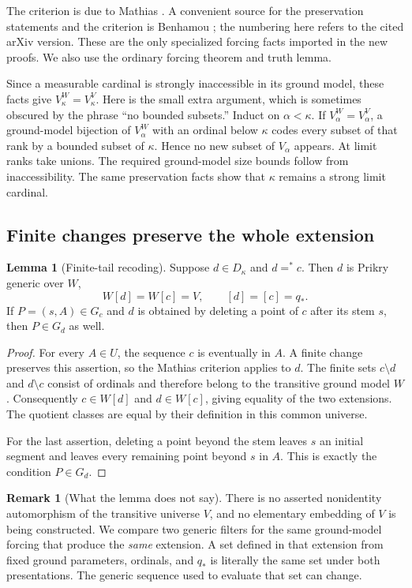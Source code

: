 \documentclass[11pt,letterpaper]{article}
\theoremstyle{definition}
\newtheorem{lemma}[definition]{Lemma}
\newtheorem{remark}[definition]{Remark}
\numberwithin{equation}{section}
\begin{document}
The criterion is due to Mathias \cite{mathias}. A convenient source for the
preservation statements and the criterion is Benhamou
\cite[Corollaries~3.12, 3.15; Theorem~3.17]{benhamou}; the numbering here refers
to the cited arXiv version. These are the only specialized forcing facts
imported in the new proofs. We also use the ordinary forcing theorem and
truth lemma.

Since a measurable cardinal is strongly inaccessible in its ground model,
these facts give $V_\kappa^W=V_\kappa^V$. Here is the small extra argument,
which is sometimes obscured by the phrase ``no bounded subsets.'' Induct on
$\alpha<\kappa$. If $V_\alpha^W=V_\alpha^V$, a ground-model bijection of
$V_\alpha^W$ with an ordinal below $\kappa$ codes every subset of that rank by
a bounded subset of $\kappa$. Hence no new subset of $V_\alpha$ appears. At
limit ranks take unions. The required ground-model size bounds follow from
inaccessibility. The same preservation facts show that $\kappa$ remains a
strong limit cardinal.

\subsection{Finite changes preserve the whole extension}

\begin{lemma}[Finite-tail recoding]\label{lem:recoding}
Suppose $d\in D_\kappa$ and $d=^*c$.
Then $d$ is Prikry generic over $W$,
\[
                 W[d]=W[c]=V,\qquad [d]=[c]=q_*.
\]
If $P=(s,A)\in G_c$ and $d$ is obtained by deleting a point of $c$ after its
stem $s$, then $P\in G_d$ as well.
\end{lemma}

\begin{proof}
For every $A\in U$, the sequence $c$ is eventually in $A$. A finite change
preserves this assertion, so the Mathias criterion applies to $d$. The
finite sets $c\setminus d$ and $d\setminus c$ consist of ordinals and therefore
belong to the transitive ground model $W$. Consequently $c\in W[d]$ and
$d\in W[c]$, giving equality of the two extensions. The quotient classes
are equal by their definition in this common universe.

For the last assertion, deleting a point beyond the stem leaves $s$ an
initial segment and leaves every remaining point beyond $s$ in $A$.
This is exactly the condition $P\in G_d$.
\end{proof}

\begin{remark}[What the lemma does not say]\label{rem:noautomorphism}
There is no asserted nonidentity automorphism of the transitive universe
$V$, and no elementary embedding of $V$ is being constructed. We compare two
generic filters for the same ground-model forcing that produce the
\emph{same} extension. A set defined in that extension from fixed ground
parameters, ordinals, and $q_*$ is literally the same set under both
presentations. The generic sequence used to evaluate that set can change.
\end{remark}
\end{document}
